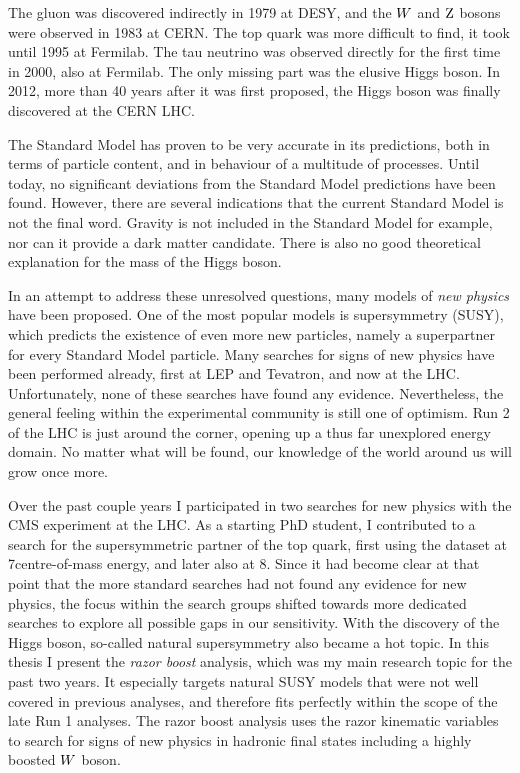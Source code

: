 The gluon was discovered indirectly in 1979 at DESY, and the $W$ and $\mathrm{Z}$ bosons were observed
in 1983 at CERN. The top quark was more difficult to find, it took until 1995 at Fermilab. The tau
neutrino was observed directly for the first time in 2000, also at Fermilab. The only missing part
was the elusive Higgs boson. In 2012, more than 40 years after it was first proposed, the Higgs
boson was finally discovered at the CERN LHC.

The Standard Model has proven to be very accurate in its predictions, both in terms of particle
content, and in behaviour of a multitude of processes. Until today, no significant deviations from
the Standard Model predictions have been found. However, there are several indications that the
current Standard Model is not the final word. Gravity is not included in the Standard Model for
example, nor can it provide a dark matter candidate. There is also no good theoretical explanation
for the mass of the Higgs boson. 

In an attempt to address these unresolved questions, many models of \textit{new physics} have been
proposed. One of the most popular models is supersymmetry (SUSY), which predicts the existence of
even more new particles, namely a superpartner for every Standard Model particle. 
Many searches for signs of new physics have been performed already, first at LEP and Tevatron, and
now at the LHC. Unfortunately, none of these searches have found any evidence.
Nevertheless, the general feeling within the experimental community is still one of optimism. Run 2
of the LHC is just around the corner, opening up a thus far unexplored energy domain. No matter what
will be found, our knowledge of the world around us will grow once more. 

Over the past couple years I participated in two searches for new physics with the CMS experiment at
the LHC. As a starting PhD student, I contributed to a search for the supersymmetric partner of the
top quark, first using the dataset at 7\TeV centre-of-mass energy, and later also at 8\TeV. 
Since it had become clear at that point that the more standard searches had not found any evidence
for new physics, the focus within the search groups shifted towards more dedicated searches to
explore all possible gaps in our sensitivity. With the discovery of the Higgs boson,
so-called natural supersymmetry also became a hot topic. 
In this thesis I present the \textit{razor boost} analysis, which was my main research topic for the
past two years. It especially targets natural SUSY models that were not well covered in previous
analyses, and therefore fits perfectly within the scope of the late Run 1 analyses. The razor boost
analysis uses the razor kinematic variables to search for signs of new physics in hadronic final
states including a highly boosted $W$ boson. 

